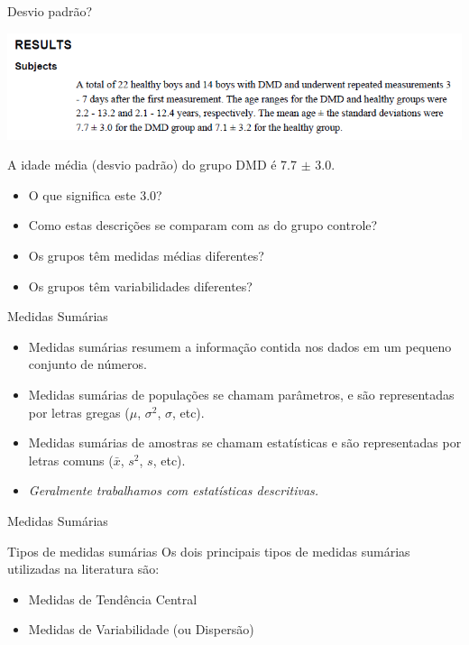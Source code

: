 \documentclass{beamer}
\begin{document}
\begin{frame}{Desvio padrão?}
  \begin{center}
    \includegraphics[width=1\textwidth]{Cap3/DP2}
  \end{center}

  \begin{block}{}
    A idade média (desvio padrão) do grupo DMD é 7.7 $\pm$ 3.0.

    \begin{itemize}
    \item O que significa este 3.0?
    \item Como estas descrições se comparam com as do grupo controle?
    \item Os grupos têm medidas médias diferentes?
    \item Os grupos têm variabilidades diferentes?
    \end{itemize}
  \end{block}
\end{frame}

\begin{frame}{Medidas Sumárias}
  \begin{itemize}
  \item Medidas sumárias resumem a informação contida nos dados em um
    pequeno conjunto de números.
  \item Medidas sumárias de \alert{populações} se chamam
    \alert{parâmetros}, e são representadas por letras gregas ($\mu$, $\sigma^2$, $\sigma$, etc).
  \item Medidas sumárias de \alert{amostras} se chamam \alert{estatísticas} e são representadas por letras comuns ($\bar{x}$, $s^2$, $s$, etc).
  \item {\em Geralmente trabalhamos com estatísticas descritivas.}
  \end{itemize}
\end{frame}

\begin{frame}{Medidas Sumárias}
  \begin{block}{Tipos de medidas sumárias}
    Os dois principais tipos de medidas sumárias utilizadas na literatura são:
    \begin{itemize}
    \item Medidas de Tendência Central
    \item Medidas de Variabilidade (ou Dispersão)
    \end{itemize}
  \end{block}
\end{frame}
\end{document}
